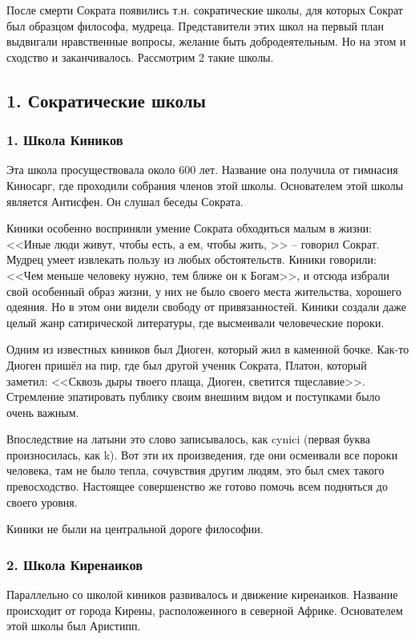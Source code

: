 \documentclass[a4paper, 12pt]{article} %
\begin{document}
После смерти Сократа появились т.н. сократические школы, для которых Сократ был образцом философа, мудреца. Представители этих школ на первый план выдвигали нравственные вопросы, желание быть добродеятельным. Но на этом и сходство и заканчивалось. Рассмотрим 2 такие школы.

\subsection*{1. Сократические школы}
\subsubsection*{1. Школа Киников}
Эта школа просуществовала около 600 лет. Название она получила от гимнасия Киносарг, где проходили собрания членов этой школы. Основателем этой школы является Антисфен. Он слушал беседы Сократа.

Киники особенно восприняли умение Сократа обходиться малым в жизни: <<Иные люди живут, чтобы есть, а ем, чтобы жить, >> -- говорил Сократ. Мудрец умеет извлекать пользу из любых обстоятельств. Киники говорили: <<Чем меньше человеку нужно, тем ближе он к Богам>>, и отсюда избрали свой особенный образ жизни, у них не было своего места жительства, хорошего одеяния. Но в этом они видели свободу от привязанностей. Киники создали даже целый жанр сатирической литературы, где высмеивали человеческие пороки.

Одним из известных киников был Диоген, который жил в каменной бочке. Как-то Диоген пришёл на пир, где был другой ученик Сократа, Платон, который заметил: <<Сквозь дыры твоего плаща, Диоген, светится тщеславие>>. Стремление эпатировать публику своим внешним видом и поступками было очень важным. 

Впоследствие на латыни это слово записывалось, как cynici (первая буква произносилась, как k). Вот эти их произведения, где они осмеивали все пороки человека, там не было тепла, сочувствия другим людям, это был смех такого превосходство. Настоящее совершенство же готово помочь всем подняться до своего уровня.

Киники не были на центральной дороге философии. 

\subsubsection*{2. Школа Киренаиков}
Параллельно со школой киников развивалось и движение киренаиков. Название происходит от города Кирены, расположенного в северной Африке. Основателем этой школы был Аристипп. 
\end{document}
